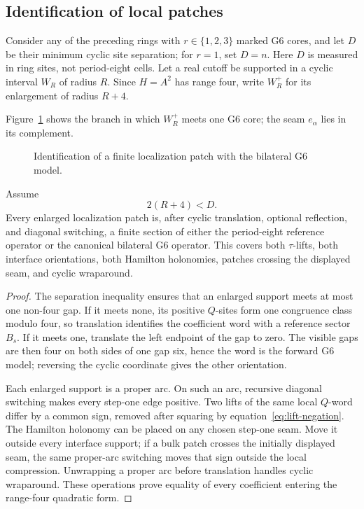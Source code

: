 \subsection{Identification of local patches}
\label{subsec:local-patch-identification}

Consider any of the preceding rings with \(r\in\{1,2,3\}\) marked G6 cores,
and let \(D\) be their minimum cyclic site separation; for \(r=1\), set
\(D=n\).  Here \(D\) is measured in ring sites, not period-eight cells.
Let a real cutoff be supported in a cyclic interval \(W_R\) of radius
\(R\). Since \(H=A^2\) has range four, write \(W_R^+\) for its enlargement
of radius \(R+4\).

Figure~\ref{fig:patch-localization} shows the branch in which \(W_R^+\)
meets one G6 core; the seam \(e_\alpha\) lies in its complement.
\begin{figure}[t]
\centering

\caption{Identification of a finite localization patch with the bilateral
G6 model.}
\label{fig:patch-localization}
\end{figure}

\begin{proposition}
\label{prop:patch-identification}
Assume
\[
2(R+4)<D.
\]
Every enlarged localization patch is, after cyclic translation, optional
reflection, and diagonal switching, a finite section of either the
period-eight reference operator or the canonical bilateral G6 operator.
This covers both \(\tau\)-lifts, both interface orientations, both Hamilton
holonomies, patches crossing the displayed seam, and cyclic wraparound.
\end{proposition}

\begin{proof}
The separation inequality ensures that an enlarged support meets at most one
non-four gap.  If it meets none, its positive \(Q\)-sites form one congruence
class modulo four, so translation identifies the coefficient word with a
reference sector \(B_s\).  If it meets one, translate the left endpoint of
the gap to zero.  The visible gaps are then four on both sides of one gap
six, hence the word is the forward G6 model; reversing the cyclic coordinate
gives the other orientation.

Each enlarged support is a proper arc.  On such an arc, recursive diagonal
switching makes every step-one edge positive.  Two lifts of the same local
\(Q\)-word differ by a common sign, removed after squaring by
equation~\eqref{eq:lift-negation}.  The Hamilton holonomy can be placed on
any chosen step-one seam.  Move it outside every interface support; if a
bulk patch crosses the initially displayed seam, the same proper-arc
switching moves that sign outside the local compression.  Unwrapping a
proper arc before translation handles cyclic wraparound.  These operations
prove equality of every coefficient entering the range-four quadratic form.
\end{proof}

